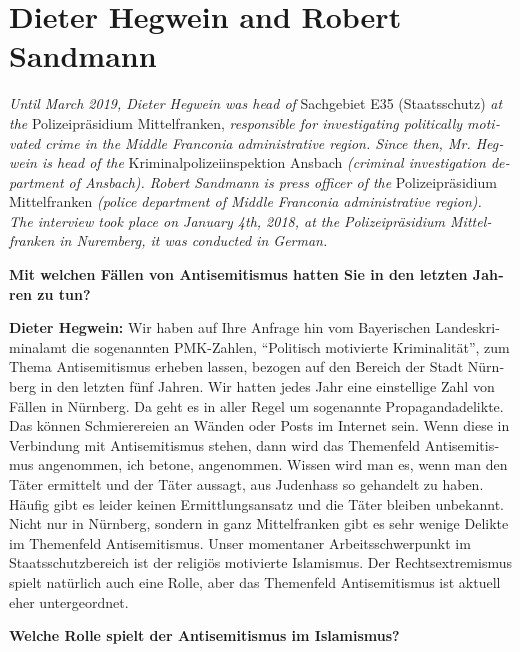 \section{Dieter Hegwein and Robert Sandmann}
\begin{otherlanguage}{ngerman}
\textit{Until March 2019, Dieter Hegwein was head of} Sachgebiet E35 (Staatsschutz) \textit{at the} Polizeipräsidium Mittelfranken, \textit{responsible for investigating politically motivated crime in the Middle Franconia administrative region. Since then, Mr. Hegwein is head of the} Kriminalpolizeiinspektion Ansbach \textit{(criminal investigation department of Ansbach). Robert Sandmann is press officer of the} Polizeipräsidium Mittelfranken \textit{(police department of Middle Franconia administrative region).\\
The interview took place on January 4th, 2018, at the Polizeipräsidium Mittelfranken in Nuremberg, it was conducted in German.}\par 
\vspace*{2em}
\textbf{Mit welchen Fällen von Antisemitismus hatten Sie in den letzten Jahren zu tun?}

\textbf{Dieter Hegwein:} Wir haben auf Ihre Anfrage hin vom Bayerischen Landeskriminalamt die sogenannten PMK-Zahlen, "`Politisch motivierte Kriminalität"', zum Thema Antisemitismus erheben lassen, bezogen auf den Bereich der Stadt Nürnberg in den letzten fünf Jahren. Wir hatten jedes Jahr eine einstellige Zahl von Fällen in Nürnberg. Da geht es in aller Regel um sogenannte Propagandadelikte. Das können Schmierereien an Wänden oder Posts im Internet sein. Wenn diese in Verbindung mit Antisemitismus stehen, dann wird das Themenfeld Antisemitismus angenommen, ich betone, angenommen. Wissen wird man es, wenn man den Täter ermittelt und der Täter aussagt, aus Judenhass so gehandelt zu haben. Häufig gibt es leider keinen Ermittlungsansatz und die Täter bleiben unbekannt. Nicht nur in Nürnberg, sondern in ganz Mittelfranken gibt es sehr wenige Delikte im Themenfeld Antisemitismus. Unser momentaner Arbeitsschwerpunkt im Staatsschutzbereich ist der religiös motivierte Islamismus. Der Rechtsextremismus spielt natürlich auch eine Rolle, aber das Themenfeld Antisemitismus ist aktuell eher untergeordnet. 

\textbf{Welche Rolle spielt der Antisemitismus im Islamismus?}


\end{otherlanguage}
